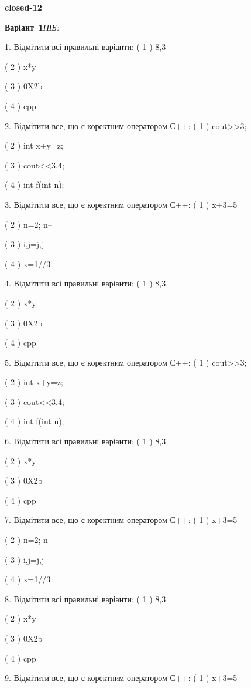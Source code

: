 \documentclass[11pt]{article}
\begin{document}
{\large\textbf{closed-12}}

\textbf{Варіант \No\,1}\hfill \textit{ПІБ:}\,\underline{\hspace{60mm}}
\vspace{4mm}

1. Відмітити всі правильні варіанти:
( 1 ) 8,3

( 2 ) x*y

( 3 ) 0X2b

( 4 ) cpp

2. Відмітити все, що є коректним оператором С++:
( 1 ) cout>>3;

( 2 ) int x+y=z;

( 3 ) cout<<3.4;

( 4 ) int f(int n);

3. Відмітити все, що є коректним оператором С++:
( 1 ) x+3=5

( 2 ) n=2; n--

( 3 ) i,j=j,j

( 4 ) x=1//3

4. Відмітити всі правильні варіанти:
( 1 ) 8,3

( 2 ) x*y

( 3 ) 0X2b

( 4 ) cpp

5. Відмітити все, що є коректним оператором С++:
( 1 ) cout>>3;

( 2 ) int x+y=z;

( 3 ) cout<<3.4;

( 4 ) int f(int n);

6. Відмітити всі правильні варіанти:
( 1 ) 8,3

( 2 ) x*y

( 3 ) 0X2b

( 4 ) cpp

7. Відмітити все, що є коректним оператором С++:
( 1 ) x+3=5

( 2 ) n=2; n--

( 3 ) i,j=j,j

( 4 ) x=1//3

8. Відмітити всі правильні варіанти:
( 1 ) 8,3

( 2 ) x*y

( 3 ) 0X2b

( 4 ) cpp

9. Відмітити все, що є коректним оператором С++:
( 1 ) x+3=5
\end{document}
